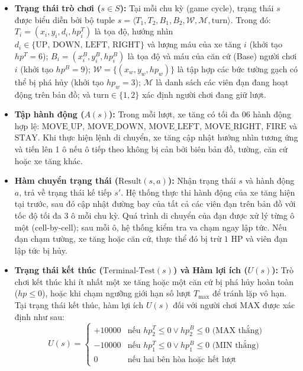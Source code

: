 \begin{itemize}
    \item \textbf{Trạng thái trò chơi ($s \in S$):} Tại mỗi chu kỳ (game cycle), trạng thái $s$ được biểu diễn bởi bộ tuple $s = \langle T_1, T_2, B_1, B_2, \mathcal{W}, \mathcal{M}, \text{turn} \rangle$. Trong đó: $T_i = (x_i, y_i, d_i, hp^T_i)$ là tọa độ, hướng nhìn $d_i \in \{\text{UP, DOWN, LEFT, RIGHT}\}$ và lượng máu của xe tăng $i$ (khởi tạo $hp^T = 6$); $B_i = (x^B_i, y^B_i, hp^B_i)$ là tọa độ và máu của căn cứ (Base) người chơi $i$ (khởi tạo $hp^B = 9$); $\mathcal{W} = \{(x_w, y_w, hp_w)\}$ là tập hợp các bức tường gạch có thể bị phá hủy (khởi tạo $hp_w = 3$); $\mathcal{M}$ là danh sách các viên đạn đang hoạt động trên bản đồ; và $\text{turn} \in \{1, 2\}$ xác định người chơi đang giữ lượt.
    \item \textbf{Tập hành động ($A(s)$):} Trong mỗi lượt, xe tăng có tối đa 06 hành động hợp lệ: $\text{MOVE\_UP}$, $\text{MOVE\_DOWN}$, $\text{MOVE\_LEFT}$, $\text{MOVE\_RIGHT}$, $\text{FIRE}$ và $\text{STAY}$. Khi thực hiện lệnh di chuyển, xe tăng cập nhật hướng nhìn tương ứng và tiến lên 1 ô nếu ô tiếp theo không bị cản bởi biên bản đồ, tường, căn cứ hoặc xe tăng khác.
    \item \textbf{Hàm chuyển trạng thái ($\text{Result}(s, a)$):} Nhận trạng thái $s$ và hành động $a$, trả về trạng thái kế tiếp $s'$. Hệ thống thực thi hành động của xe tăng hiện tại trước, sau đó cập nhật đường bay của tất cả các viên đạn trên bản đồ với tốc độ tối đa 3 ô mỗi chu kỳ. Quá trình di chuyển của đạn được xử lý từng ô một (cell-by-cell); sau mỗi ô, hệ thống kiểm tra va chạm ngay lập tức. Nếu đạn chạm tường, xe tăng hoặc căn cứ, thực thể đó bị trừ $1\text{ HP}$ và viên đạn lập tức bị hủy.
    \item \textbf{Trạng thái kết thúc ($\text{Terminal-Test}(s)$) và Hàm lợi ích ($U(s)$):} Trò chơi kết thúc khi ít nhất một xe tăng hoặc một căn cứ bị phá hủy hoàn toàn ($hp \le 0$), hoặc khi chạm ngưỡng giới hạn số lượt $T_{\max}$ để tránh lặp vô hạn. Tại trạng thái kết thúc, hàm lợi ích $U(s)$ đối với người chơi MAX được xác định như sau:
    \begin{equation}
    U(s) = \begin{cases} 
    +10000 & \text{nếu } hp^T_2 \le 0 \lor hp^B_2 \le 0 \text{ (MAX thắng)} \\
    -10000 & \text{nếu } hp^T_1 \le 0 \lor hp^B_1 \le 0 \text{ (MIN thắng)} \\
    0 & \text{nếu hai bên hòa hoặc hết lượt}
    \end{cases}
    \end{equation}
\end{itemize}

